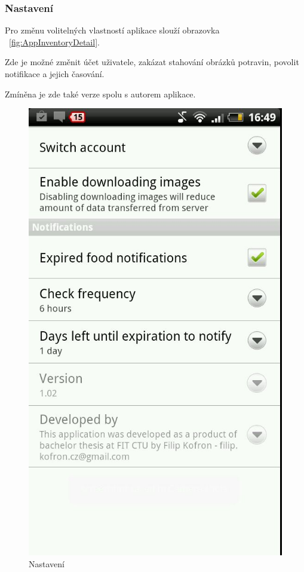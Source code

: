 \documentclass[thesis=B,czech]{FITthesis}[2013/10/20]
\begin{document}
\clearpage

\subsubsection{Nastavení}

Pro změnu volitelných vlastností aplikace slouží obrazovka ~\ref{fig:AppInventoryDetail}.

Zde je možné změnit účet uživatele, zakázat stahování obrázků potravin, povolit notifikace a jejich časování.

Zmíněna je zde také verze spolu s autorem aplikace.

\begin{figure}[H]
  \centering
  \includegraphics[scale=0.4]{screenshots/app_settings.jpg}
  \caption{Nastavení}
  \label{fig:AppSettings}
\end{figure}
\end{document}
